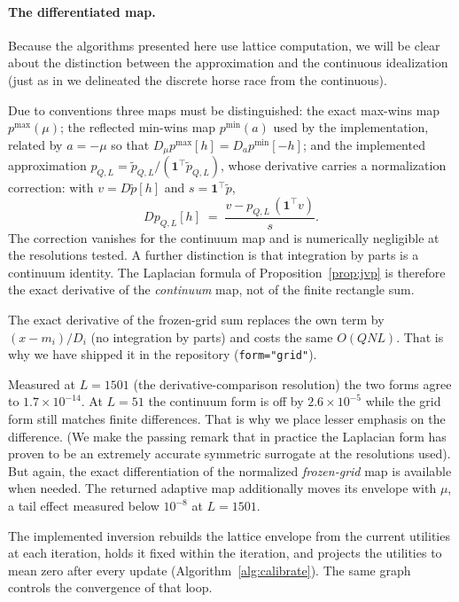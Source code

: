\documentclass[12pt]{article}
\theoremstyle{remark}
\begin{document}
\paragraph{The differentiated map.} 
Because the algorithms presented here use lattice computation, we will be clear about
the distinction between the approximation and the continuous idealization (just as in \citet{cotton2021}
we delineated the discrete horse race from the continuous). 

Due to conventions three maps must be
distinguished: the exact max-wins map $p^{\max}(\mu)$; the reflected
min-wins map $p^{\min}(a)$ used by the implementation, related by $a = -\mu$
so that $D_\mu p^{\max}[h] = D_a p^{\min}[-h]$; and the implemented
approximation $p_{Q,L} = \tilde p_{Q,L} / (\mathbf{1}^\top \tilde
p_{Q,L})$, whose derivative carries a normalization correction: with $v =
D\tilde p[h]$ and $s = \mathbf{1}^\top \tilde p$,
\[
D p_{Q,L}[h] \;=\; \frac{v - p_{Q,L}\, (\mathbf{1}^\top v)}{s}.
\]
The correction vanishes for the continuum map and is numerically
negligible at the resolutions tested. A further distinction is that integration by parts is a continuum
identity. The Laplacian formula of Proposition~\ref{prop:jvp} is
therefore the exact derivative of the \emph{continuum} map, not of the
finite rectangle sum.

The exact derivative of the frozen-grid sum replaces the own term by
$(x - m_i)/D_i$ (no integration by parts) and costs the same $O(QNL)$. That is why we have shipped it in the repository
(\texttt{form="grid"}).

Measured at $L = 1501$ (the derivative-comparison resolution) the
two forms agree to $1.7\times10^{-14}$. At $L = 51$ the continuum form is
off by $2.6\times10^{-5}$ while the grid form still matches finite
differences. That is why we place lesser emphasis on the difference. (We make the passing remark
that in practice the Laplacian form has proven to be
 an extremely accurate symmetric surrogate at the
resolutions used). But again, the exact differentiation of the normalized
\emph{frozen-grid} map is available when needed.  The returned adaptive map
additionally moves its envelope with $\mu$, a tail effect measured below
$10^{-8}$ at $L = 1501$.

The implemented inversion rebuilds the lattice envelope from the current
utilities at each iteration, holds it fixed within the iteration, and
projects the utilities to mean zero after every update
(Algorithm~\ref{alg:calibrate}). The same graph controls the
convergence of that loop.
\end{document}
